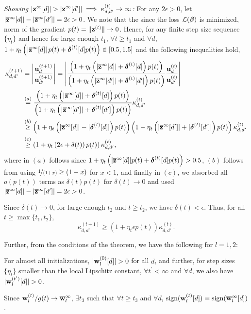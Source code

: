 \documentclass{article}
\renewcommand{\norm}[1]{\lVert #1 \rVert}
\renewcommand{\c}{\mathcal}
\renewcommand{\b}{\mathbf}
\renewcommand{\bar}{\overline}
\renewcommand{\u}[1][]{\ifthenelse{\equal{#1}{}}{\mathbf{w}}{\mathbf{w}^{(#1)}}}
\newcommand{\w}[1][]{\ifthenelse{\equal{#1}{}}{\boldsymbol{\beta}}{\boldsymbol{\beta}^{(#1)}}}
\newcommand{\z}[1][]{\ifthenelse{\equal{#1}{}}{\mathbf{z}}{\mathbf{z}^{(#1)}}}
\newcommand{\bdelta}[1][]{\ifthenelse{\equal{#1}{}}{{\boldsymbol{\delta}}}{\boldsymbol{\delta}^{(#1)}}}
\begin{document}
{{\textit{Showing $|\bar{\z}^\infty[d]|>|\bar{\z}^\infty[d']|\implies \kappa_{d,d'}^{(t)}\to\infty$:} For any $2\epsilon>0$, let $|\bar{\z}^\infty[d]|-|\bar{\z}^\infty[d']|=2\epsilon>0$. We note that the since the loss $\c{L}(\w)$ is minimized, norm of the gradient $p(t)=\norm{\z[t]}\to0$. Hence, for any finite step size sequence $\{\eta_t\}$ and hence for large enough $t_1$, $\forall t\ge t_1$ and $\forall d$, $1+\eta_t\left(\left|\bar{\z}^\infty[d]\right|p(t)+\bdelta[t][d]p(t)\right)\in[0.5,1.5]$ and the following inequalities hold,
\begin{align}
\kappa_{d,d'}^{(t+1)}&=\left|\frac{\b{u}_d^{(t+1)}}{\b{u}_{d'}^{(t+1)}}\right|=\left|\frac{\left(1+\eta_t\left(|\bar{\z}^\infty[d]|+\bdelta[t][d]\right)p(t)\right)}{\left(1+\eta_t\left(|\bar{\z}^\infty[d']|+\bdelta[t][d']\right)p(t)\right)} \frac{\b{u}_d^{(t)}}{\b{u}_{d'}^{(t)}}\right|\\
&\overset{(a)}=\frac{\left(1+\eta_t\left(|\bar{\z}^\infty[d]|+\bdelta[t][d]\right)p(t)\right)}{\left(1+\eta_t\left(|\bar{\z}^\infty[d']|+\bdelta[t][d']\right)p(t)\right)} \kappa_{d,d'}^{(t)}\\
&\overset{(b)}\ge \left(1+\eta_t\left(|\bar{\z}^\infty[d]|-|\bdelta[t][d]|\right)p(t)\right)\left(1-\eta_t\left(|\bar{\z}^\infty[d']|+|\bdelta[t][d']|\right)p(t)\right)\kappa_{d,d'}^{(t)}\\
&\overset{(c)}\ge \left(1+\eta_t\left(2\epsilon+\delta(t)\right)p(t)\right)\kappa_{d,d'}^{(t)},
\end{align}
where in $(a)$ follows since  $1+\eta_t\left(|\bar{\z}^\infty[d]|p(t)+\bdelta[t][d]p(t)\right)>0.5$,  $(b)$ follows from using $\nicefrac{1}{(1+x)}\ge (1-x)$ for $x< 1$, and finally in $(c)$, we absorbed all $o(p(t))$ terms as $\delta(t)p(t)$ for $\delta(t)\to0$ and used $|\bar{\z}^\infty[d]|-|\bar{\z}^\infty[d']|=2\epsilon>0$. 

Since $\delta(t)\to0$, for large enough $t_2$ and $t\ge t_2$, we have $\delta(t)<\epsilon$. Thus, for all $t\ge \max\{t_1,t_2\}$, 
\begin{equation}
\kappa_{d,d'}^{(t+1)}\ge \left(1+\eta_t\epsilon p(t)\right)\kappa_{d,d'}^{(t)}.
\label{eq:kt}
\end{equation}


Further,  from the conditions of the theorem, we have the following for $l=1,2$:
\begin{asparaenum}
\item For almost all initializations, $|\u[0]_l[d]|>0$ for all $d$, and further, for step sizes $\{\eta_t\}$ smaller than the local Lipschitz constant, $\forall t^\prime<\infty$ and $\forall d$, we also have $|\u[t^\prime]_l[d]|>0$. 
\item Since $\u[t]_l/g(t)\to\bar{\u}_l^\infty$, $\exists t_3$ such that $\forall t\ge t_3$ and $\forall d$, $\text{sign}(\u[t]_l[d])=\text{sign}(\bar{\u}_l^\infty [d])$. 
\end{asparaenum}

}}
\end{document}
